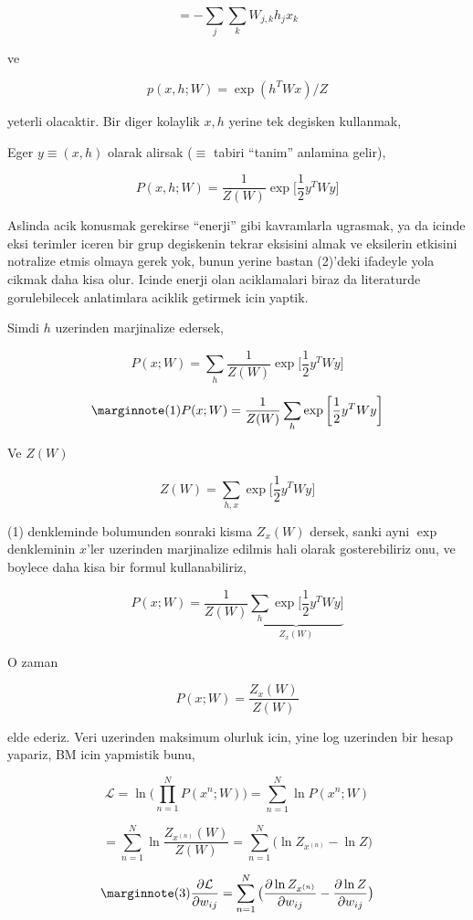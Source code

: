 \documentclass[12pt,fleqn]{article}\usepackage{../common}
\begin{document}
$$ = - \sum_j \sum_k W_{j,k}h_jx_k  $$

ve

$$ p(x,h;W)  = \exp (h^TWx) / Z $$

yeterli olacaktir. Bir diger kolaylik $x,h$ yerine tek degisken kullanmak,

Eger $y \equiv (x,h)$ olarak alirsak ($\equiv$ tabiri ``tanim'' anlamina gelir), 


$$ P(x,h;W) = \frac{1}{Z(W)} \exp 
\bigg[ 
\frac{1}{2} y^T W y
\bigg]
$$

Aslinda acik konusmak gerekirse ``enerji'' gibi kavramlarla ugrasmak, ya da
icinde eksi terimler iceren bir grup degiskenin tekrar eksisini almak ve
eksilerin etkisini notralize etmis olmaya gerek yok, bunun yerine bastan
(2)'deki ifadeyle yola cikmak daha kisa olur. Icinde enerji olan
aciklamalari biraz da literaturde gorulebilecek anlatimlara aciklik
getirmek icin yaptik.

Simdi $h$ uzerinden marjinalize edersek,

$$ P(x;W) = \sum_h \frac{1}{Z(W)} \exp 
\bigg[ 
\frac{1}{2} y^T W y
\bigg]
$$


$$  
\mlabel{1}
P(x;W) = \frac{1}{Z(W)}  \sum_h \exp 
\bigg[ 
\frac{1}{2} y^T W y
\bigg]
$$


Ve $Z(W)$ 

$$ Z(W) = \sum_{h,x} \exp 
\bigg[ 
\frac{1}{2} y^T W y
\bigg]
$$

(1) denkleminde bolumunden sonraki kisma $Z_x(W)$ dersek, sanki ayni $\exp$
denkleminin $x$'ler uzerinden marjinalize edilmis hali olarak
gosterebiliriz onu, ve boylece daha kisa bir formul kullanabiliriz,

$$  
P(x;W) = \frac{1}{Z(W)}  
\underbrace{
\sum_h \exp 
\bigg[ 
\frac{1}{2} y^T W y
\bigg]
}_{Z_x(W)}
$$

O zaman 

$$  
P(x;W) = \frac{Z_x(W)}{Z(W)} 
$$

elde ederiz. Veri uzerinden maksimum olurluk icin, yine log uzerinden bir
hesap yapariz, BM icin yapmistik bunu,

$$  
\mathcal{L} = 
\ln \big( \prod_{n=1}^{N} P(x^{n};W) \big) = 
\sum_{n=1}^{N} \ln P(x^{n};W) 
$$

$$ 
= \sum_{n=1}^{N} \ln \frac{Z_{x^{(n)}}(W)}{Z(W)}  
= \sum_{n=1}^{N}  \big(\ln Z_{x^{(n)}} - \ln Z \big) 
$$

$$ 
\mlabel{3}
\frac{\partial \mathcal{L} }{\partial w_{ij}} = 
\sum_{n=1}^{N}  \big( \frac{\partial \ln Z_{x^{(n)}} }{\partial w_{ij}}
- \frac{\partial \ln Z }{\partial w_{ij}} \big)
$$
\end{document}
